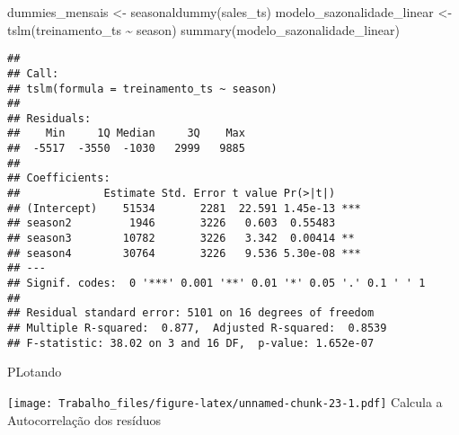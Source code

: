 \documentclass[
]{article}
\newenvironment{Shaded}{\begin{snugshade}}{\end{snugshade}}
\newcommand{\AttributeTok}[1]{\textcolor[rgb]{0.77,0.63,0.00}{#1}}
\newcommand{\DecValTok}[1]{\textcolor[rgb]{0.00,0.00,0.81}{#1}}
\newcommand{\FunctionTok}[1]{\textcolor[rgb]{0.00,0.00,0.00}{#1}}
\newcommand{\NormalTok}[1]{#1}
\newcommand{\OtherTok}[1]{\textcolor[rgb]{0.56,0.35,0.01}{#1}}
\newcommand{\SpecialCharTok}[1]{\textcolor[rgb]{0.00,0.00,0.00}{#1}}
\newcommand{\StringTok}[1]{\textcolor[rgb]{0.31,0.60,0.02}{#1}}
\begin{document}
\begin{Shaded}
\begin{Highlighting}[]
\NormalTok{dummies\_mensais }\OtherTok{\textless{}{-}} \FunctionTok{seasonaldummy}\NormalTok{(sales\_ts)}
\NormalTok{modelo\_sazonalidade\_linear }\OtherTok{\textless{}{-}} \FunctionTok{tslm}\NormalTok{(treinamento\_ts }\SpecialCharTok{\textasciitilde{}}\NormalTok{ season)}
\FunctionTok{summary}\NormalTok{(modelo\_sazonalidade\_linear)}
\end{Highlighting}
\end{Shaded}

\begin{verbatim}
## 
## Call:
## tslm(formula = treinamento_ts ~ season)
## 
## Residuals:
##    Min     1Q Median     3Q    Max 
##  -5517  -3550  -1030   2999   9885 
## 
## Coefficients:
##             Estimate Std. Error t value Pr(>|t|)    
## (Intercept)    51534       2281  22.591 1.45e-13 ***
## season2         1946       3226   0.603  0.55483    
## season3        10782       3226   3.342  0.00414 ** 
## season4        30764       3226   9.536 5.30e-08 ***
## ---
## Signif. codes:  0 '***' 0.001 '**' 0.01 '*' 0.05 '.' 0.1 ' ' 1
## 
## Residual standard error: 5101 on 16 degrees of freedom
## Multiple R-squared:  0.877,  Adjusted R-squared:  0.8539 
## F-statistic: 38.02 on 3 and 16 DF,  p-value: 1.652e-07
\end{verbatim}

PLotando

\begin{Shaded}
\end{Shaded}

\texttt{[image: Trabalho\_files/figure-latex/unnamed-chunk-23-1.pdf]}
Calcula a Autocorrelação dos resíduos

\begin{Shaded}
\end{Shaded}
\end{document}
